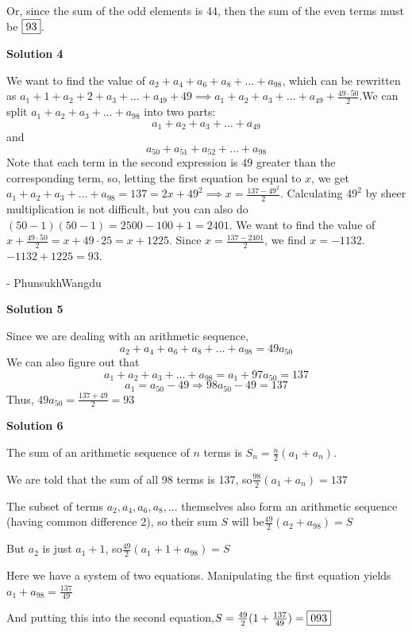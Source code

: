 \begin{enumerate}
 Or, since the sum of the odd elements is 44, then the sum of the even terms must be $\fbox{93}$.

 



\textbf{Solution 4}

We want to find the value of $a_2+a_4+a_6+a_8+\ldots+a_{98}$, which can be rewritten as $a_1+1+a_2+2+a_3+\ldots+a_{49}+49 \implies a_1+a_2+a_3+\ldots+a_{49}+\frac{49 \cdot 50}{2}$.We can split $a_1+a_2+a_3+\ldots+a_{98}$ into two parts:
 \[a_1+a_2+a_3+\ldots+a_{49}\] and 
 \[a_{50}+a_{51}+a_{52}+\ldots+a_{98}\]Note that each term in the second expression is $49$ greater than the corresponding term, so, letting the first equation be equal to $x$, we get $a_1+a_2+a_3+\ldots+a_{98}=137=2x+49^2 \implies x=\frac{137-49^2}{2}$. Calculating $49^2$ by sheer multiplication is not difficult, but you can also do $(50-1)(50-1)=2500-100+1=2401$. We want to find the value of $x+\frac{49 \cdot 50}{2}=x+49 \cdot 25=x+1225$. Since $x=\frac{137-2401}{2}$, we find $x=-1132$. $-1132+1225=\boxed{93}$.

 - PhunsukhWangdu

 



\textbf{Solution 5}

Since we are dealing with an arithmetic sequence, 
 \[a_2+a_4+a_6+a_8+\ldots+a_{98} = 49a_{50}\]We can also figure out that 
 \[a_1+a_2+a_3+\ldots+a_{98} = a_1 + 97a_{50} = 137\]
 \[a_1 = a_{50}-49 \Rightarrow 98a_{50}-49 = 137\]Thus, $49a_{50} = \frac{137 + 49}{2} = \boxed{93}$




\textbf{Solution 6}

The sum of an arithmetic sequence of $n$ terms is $S_n = \frac{n}{2}(a_1 + a_n)$.

 We are told that the sum of all 98 terms is 137, so$\frac{98}{2}(a_1 + a_n) = 137$

 The subset of terms $a_2, a_4, a_6, a_8, ...$ themselves also form an arithmetic sequence (having common difference 2), so their sum $S$ will be$\frac{49}{2}(a_2 + a_{98}) = S$

 But $a_2$ is just $a_1 + 1$, so$\frac{49}{2}(a_1 + 1 + a_{98}) = S$

 Here we have a system of two equations. Manipulating the first equation yields$a_1 + a_{98} = \frac{137}{49}$

 And putting this into the second equation,$S = \frac{49}{2}(1 + \frac{137}{49}) = \fbox{093}$




\end{enumerate}
